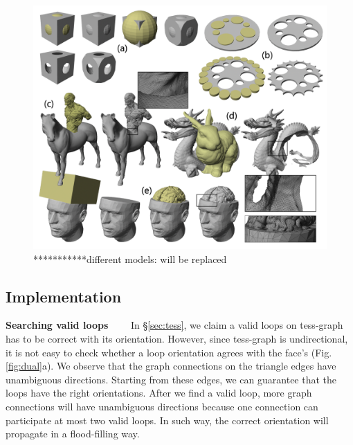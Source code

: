 \documentclass[10pt,journal,compsoc]{IEEEtran}
\begin{document}
\begin{figure}[!t]
\centering
\includegraphics[width=7in]{models}
\caption{***********different models: will be replaced}
\label{fig:models}
\end{figure}

\subsection{Implementation}
\label{sec:esubroutine}


\vspace{0.5em}
\noindent\textbf{Searching valid loops}~~~~ In \S\ref{sec:tess}, we claim a valid loops on tess-graph has to be correct with its orientation. However, since tess-graph is undirectional, it is not easy to check whether a loop orientation agrees with the face's (Fig. \ref{fig:dual}a). We observe that the graph connections on the triangle edges have unambiguous directions. Starting from these edges, we can guarantee that the loops have the right orientations. After we find a valid loop, more graph connections will have unambiguous directions because one connection can participate at most two valid loops. In such way, the correct orientation will propagate in a flood-filling way.
\end{document}
